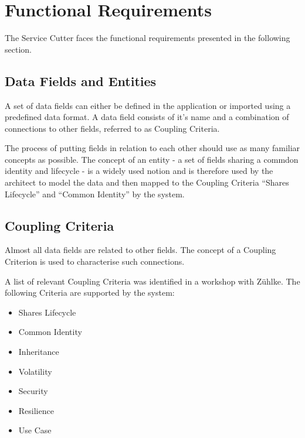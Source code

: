 \section{Functional Requirements}

The Service Cutter faces the functional requirements presented in the following
section.






\subsection{Data Fields and Entities}

A set of data fields can either be defined in the application or imported using a predefined data format. A data field consists of it's name and a combination of connections to other fields, referred to as Coupling Criteria.

The process of putting fields in relation to each other should use as many familiar concepts as possible. The concept of an entity - a set of fields sharing a commdon identity and lifecycle\cite[p.13]{evans2014domain} - is a widely used notion and is therefore used by the architect to model the data and then mapped to the Coupling Criteria \enquote{Shares Lifecycle} and \enquote{Common Identity} by the system.

\subsection{Coupling Criteria}

Almost all data fields are related to other fields. The concept of a Coupling Criterion is used to characterise such connections.

A list of relevant Coupling Criteria was identified in a workshop with Zühlke. The following Criteria are supported by the system:

\begin{itemize}
	\item Shares Lifecycle
	\item Common Identity
	\item Inheritance
	\item Volatility
	\item Security
	\item Resilience
	\item Use Case
\end{itemize}

